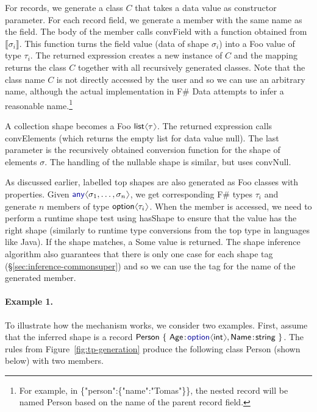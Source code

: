 \documentclass[10pt]{sigplanconf}
\newcommand{\langl}{\begin{picture}(4.5,7)
\put(1.1,2.5){\rotatebox{60}{\line(1,0){5.5}}}
\put(1.1,2.5){\rotatebox{300}{\line(1,0){5.5}}}
\end{picture}}
\newcommand{\rangl}{\begin{picture}(4.5,7)
\put(.9,2.5){\rotatebox{120}{\line(1,0){5.5}}}
\put(.9,2.5){\rotatebox{240}{\line(1,0){5.5}}}
\end{picture}}
\newcommand{\kvd}[1]{\textnormal{\textcolor{kvdclr}{\sffamily #1}}}
\newcommand{\str}[1]{\textnormal{\textcolor{strclr}{\sffamily "#1"}}}
\newcommand{\ident}[1]{\textnormal{\sffamily #1}}
\newcommand{\sem}[1]{\llbracket #1 \rrbracket}
\begin{document}

For records, we generate a class $C$ that takes a data value as constructor parameter. For each 
record field, we generate a member with the same name as the field. The body of the member calls 
\ident{convField} with a function obtained from $\sem{\sigma_i}$. This function turns the field 
value (data of shape $\sigma_i$) into a Foo value of type $\tau_i$. The returned expression creates a new instance of 
$C$ and the mapping returns the class $C$ together with all recursively generated classes. Note that 
the class name $C$ is not directly accessed by the user and so we can use an arbitrary name, although the 
actual implementation in F\# Data attempts to infer a reasonable name.\footnote{For example, in 
\ident{\{\str{person}:\{\str{name}:\str{Tomas}\}\}}, the nested record will be named \ident{Person}
based on the name of the parent record field.}

A collection shape becomes a Foo $\ident{list}\langl\tau\rangl$. The returned expression calls \ident{convElements}
(which returns the empty list for data value \kvd{null}). The last parameter is the recursively obtained
conversion function for the shape of elements $\sigma$. The handling of the nullable shape is similar,
but uses \ident{convNull}.

As discussed earlier, labelled top shapes are also generated as Foo classes with properties. Given 
$\kvd{any}\langl\sigma_1, \ldots, \sigma_n\rangl$, we get corresponding F\# types $\tau_i$ and generate 
$n$ members of type $\ident{option}\langl \tau_i\rangl$. When the member is accessed, we need to perform
a runtime shape test using \ident{hasShape} to ensure that the value has the right shape (similarly to runtime 
type conversions from the top type in languages like Java). If the shape matches, a \ident{Some} value is 
returned. The shape inference algorithm also guarantees that there is only one case for each shape tag 
(\S\ref{sec:inference-commonsuper}) and so we can use the tag for the name of the generated member.


\paragraph{Example 1.}
To illustrate how the mechanism works, we consider two examples. First, assume 
that the inferred shape is a record  
$\ident{Person}~\{~\ident{Age}\!:\!\kvd{option}\langl\ident{int}\rangl, \ident{Name}\!:\!\ident{string}~ \}$. 
The rules from Figure~\ref{fig:tp-generation} produce the following class \ident{Person} (shown below)
with two members.
\end{document}
